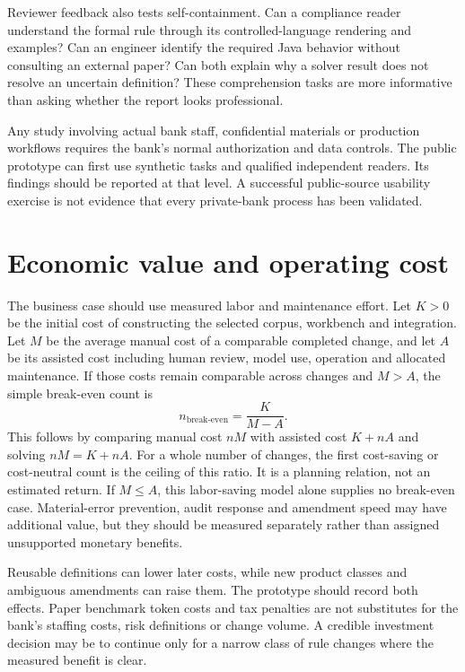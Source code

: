 Reviewer feedback also tests self-containment. Can a compliance reader understand
the formal rule through its controlled-language rendering and examples? Can an
engineer identify the required Java behavior without consulting an external paper?
Can both explain why a solver result does not resolve an uncertain definition?
These comprehension tasks are more informative than asking whether the report
looks professional.

Any study involving actual bank staff, confidential materials or production
workflows requires the bank's normal authorization and data controls. The public
prototype can first use synthetic tasks and qualified independent readers.
Its findings should be reported at that level. A successful public-source
usability exercise is not evidence that every private-bank process has been
validated.

\section{Economic value and operating cost}
\label{merge:P-04-prototype:06}


The business case should use measured labor and maintenance effort. Let $K>0$ be
the initial cost of constructing the selected corpus, workbench and integration.
Let $M$ be the average manual cost of a comparable completed change, and let $A$
be its assisted cost including human review, model use, operation and allocated
maintenance. If those costs remain comparable across changes and $M>A$, the
simple break-even count is
\begin{equation}
 n_{\mathrm{break\text{-}even}}=\frac{K}{M-A}.
 \label{eq:cost}
\end{equation}
This follows by comparing manual cost $nM$ with assisted cost $K+nA$ and solving
$nM=K+nA$. For a whole number of changes, the first cost-saving or
cost-neutral count is the ceiling of this ratio. It is a planning
relation, not an estimated return. If $M\leq A$, this
labor-saving model alone supplies no break-even case. Material-error prevention,
audit response and amendment speed may have additional value, but they should be
measured separately rather than assigned unsupported monetary benefits.


Reusable definitions can lower later costs, while new product classes and
ambiguous amendments can raise them. The prototype should record both effects.
Paper benchmark token costs and tax penalties are not substitutes for the bank's
staffing costs, risk definitions or change volume. A credible investment decision
may be to continue only for a narrow class of rule changes where the measured
benefit is clear.


